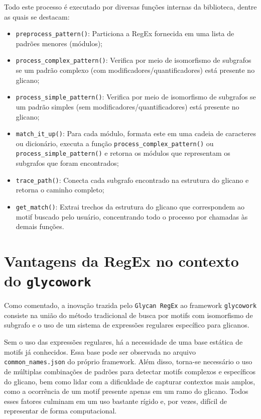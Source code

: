 Todo este processo é executado por diversas funções internas da biblioteca,
dentre as quais se destacam:
\begin{itemize}
	\item \texttt{preprocess\_pattern()}: Particiona a RegEx fornecida em uma lista de padrões menores (módulos);
	\item \texttt{process\_complex\_pattern()}: Verifica por meio de isomorfismo de subgrafos se um padrão complexo (com modificadores/quantificadores) está presente no glicano;
	\item \texttt{process\_simple\_pattern()}: Verifica por meio de isomorfismo de subgrafos se um padrão simples (sem modificadores/quantificadores) está presente no glicano;
	\item \texttt{match\_it\_up()}: Para cada módulo, formata este em uma cadeia de caracteres ou dicionário, executa a função \texttt{process\_complex\_pattern()} ou \texttt{process\_simple\_pattern()} e retorna os módulos que representam os subgrafos que foram encontrados;
	\item \texttt{trace\_path()}: Conecta cada subgrafo encontrado na estrutura do glicano e retorna o caminho completo;
	\item \texttt{get\_match()}: Extrai trechos da estrutura do glicano que correspondem ao motif buscado pelo usuário, concentrando todo o processo por chamadas às demais funções.
\end{itemize}

\section{Vantagens da RegEx no contexto do \texttt{glycowork}}

Como comentado, a inovação trazida pelo \texttt{Glycan RegEx} ao framework
\texttt{glycowork} consiste na união do método tradicional de busca por motifs
com isomorfismo de subgrafo e o uso de um sistema de expressões regulares
específico para glicanos.

Sem o uso das expressões regulares, há a necessidade de uma base estática de
motifs já conhecidos. Essa base pode ser observada no arquivo
\texttt{common\_names.json} do próprio framework. Além disso, torna-se
necessário o uso de múltiplas combinações de padrões para detectar motifs
complexos e específicos do glicano, bem como lidar com a dificuldade de
capturar contextos mais amplos, como a ocorrência de um motif presente apenas
em um ramo do glicano. Todos esses fatores culminam em um uso bastante rígido
e, por vezes, difícil de representar de forma computacional.

